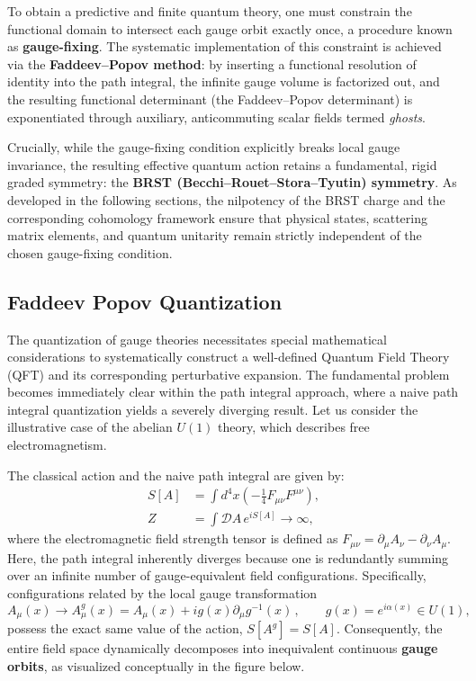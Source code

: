 To obtain a predictive and finite quantum theory, one must constrain the functional domain to intersect each gauge orbit exactly once, a procedure known as \textbf{gauge-fixing}. The systematic implementation of this constraint is achieved via the \textbf{Faddeev--Popov method}: by inserting a functional resolution of identity into the path integral, the infinite gauge volume is factorized out, and the resulting functional determinant (the Faddeev--Popov determinant) is exponentiated through auxiliary, anticommuting scalar fields termed \textit{ghosts}.

Crucially, while the gauge-fixing condition explicitly breaks local gauge invariance, the resulting effective quantum action retains a fundamental, rigid graded symmetry: the \textbf{BRST (Becchi--Rouet--Stora--Tyutin) symmetry}. As developed in the following sections, the nilpotency of the BRST charge and the corresponding cohomology framework ensure that physical states, scattering matrix elements, and quantum unitarity remain strictly independent of the chosen gauge-fixing condition.

\subsection{Faddeev Popov Quantization}

The quantization of gauge theories necessitates special mathematical considerations to systematically construct a well-defined Quantum Field Theory (QFT) and its corresponding perturbative expansion. The fundamental problem becomes immediately clear within the path integral approach, where a naive path integral quantization yields a severely diverging result. Let us consider the illustrative case of the abelian \(U(1)\) theory, which describes free electromagnetism.

The classical action and the naive path integral are given by:
\begin{equation} \label{eq:naive_action_Z}
    \begin{aligned}
        S[A] & = \int d^4x \left( -\frac{1}{4}F_{\mu\nu}F^{\mu\nu} \right), \\
        Z    & = \int \mathcal{D}A \, e^{iS[A]} \to \infty,
    \end{aligned}
\end{equation}
where the electromagnetic field strength tensor is defined as \(F_{\mu\nu} = \partial_\mu A_\nu - \partial_\nu A_\mu\). Here, the path integral inherently diverges because one is redundantly summing over an infinite number of gauge-equivalent field configurations. Specifically, configurations related by the local gauge transformation
\begin{equation} \label{eq:gauge_transformation}
    A_\mu(x) \rightarrow A_\mu^g(x) = A_\mu(x) + i g(x)\partial_\mu g^{-1}(x) \, , \qquad g(x) = e^{i\alpha(x)} \in U(1),
\end{equation}
possess the exact same value of the action, \(S[A^g] = S[A]\). Consequently, the entire field space dynamically decomposes into inequivalent continuous \textbf{gauge orbits}, as visualized conceptually in the figure below.

